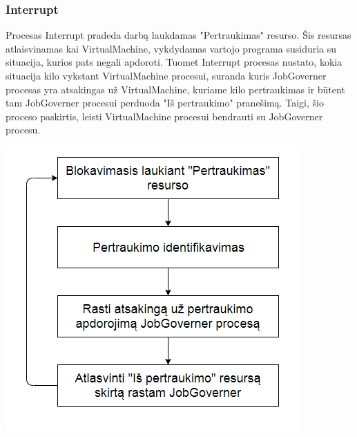 \documentclass{scrartcl}
\begin{document}
      \subsubsection{Interrupt}
        Procesas Interrupt pradeda darbą laukdamas "Pertraukimas" resurso. Šis resursas atlaisvinamas kai VirtualMachine, vykdydamas vartojo programa susiduria su situacija, kurios pats negali apdoroti. Tuomet Interrupt procesas nustato, kokia situacija kilo vykstant VirtualMachine procesui, suranda kuris JobGoverner procesas yra atsakingas už VirtualMachine, kuriame kilo pertraukimas ir būtent tam JobGoverner procesui perduoda "Iš pertraukimo" pranešimą. Taigi, šio proceso paskirtis, leisti VirtualMachine procesui bendrauti su JobGoverner procesu.
        \begin{center}
          \includegraphics[scale=1]{Interrupt}
        \end{center}
\end{document}
